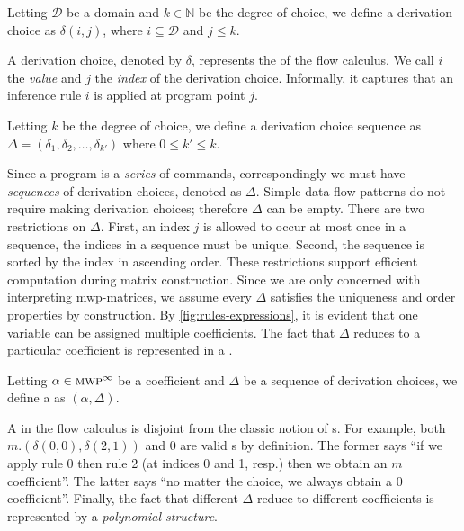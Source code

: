 \begin{definition}
    Letting \( \mathcal{D} \) be a domain and \( k \in \mathbb{N} \) be the degree of choice,
    we define a derivation choice as \( \delta(i, j) \), where \( i \subseteq \mathcal{D} \) and \( j \leq k \).\end{definition}
A derivation choice, denoted by \(\delta\), represents the  of the flow calculus.
We call \(i\) the \emph{value} and \(j\) the \emph{index} of the derivation choice.
Informally, it captures that an inference rule \(i\) is applied at program point \(j\).

\begin{definition}
    Letting \(k\) be the degree of choice,
    we define a derivation choice sequence as \(\Delta = (\delta_1, \delta_2, \dots, \delta_{k'})\)
    where \(0 \leq k' \leq k \). %
\end{definition}
Since a program is a \emph{series} of commands, correspondingly we must have \emph{sequences} of derivation choices, denoted as \(\Delta\).
Simple data flow patterns do not require making derivation choices;
therefore \(\Delta\) can be empty.
There are two restrictions on \(\Delta\).
First, an index \(j\) is allowed to occur at most once in a sequence, \ie the indices in a sequence must be unique.
Second, the sequence is sorted by the index in ascending order.
These restrictions support efficient computation during matrix construction.
Since we are only concerned with {interpreting} mwp-matrices, we assume every \(\Delta\) satisfies the uniqueness and order properties by construction.
By \autoref{fig:rules-expressions}, it is evident that one variable can be assigned multiple coefficients.
The fact that \(\Delta\) reduces to a particular coefficient is represented in a \emph{}.

\begin{definition}[Monomial]\label{def:mono}
Letting \(\alpha \in \text{\textsc{mwp}}^\infty\) be a coefficient and \(\Delta\) be a sequence of derivation choices,
we define a  as \((\alpha, \Delta)\).
\end{definition}

\noindent
A  in the flow calculus is disjoint from the classic notion of s.
For example, both \(m.(\delta(0,0),\delta(2,1))\) and \(0\) are valid s by definition.
The former says \enquote{if we apply rule 0 then rule 2 (at indices 0 and 1, resp.) then we obtain an \(m\) coefficient}.
The latter says \enquote{no matter the choice, we always obtain a \(0\) coefficient}.
Finally, the fact that {different \(\Delta\)} reduce to {different coefficients} is represented by a \emph{polynomial structure}.

